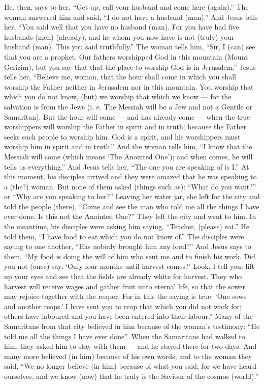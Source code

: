 \begin{pages}
\begin{Leftside}
		He, then, says to her, “Get up, call your husband and come here (again).” The woman answered him and said, “I do not have a husband (man).” And Jesus tells her, “You said well that you have no husband (man). For you have had five husbands (men) (already), and he whom you now have is not (truly) your husband (man). This you said truthfully.” The woman tells him, “Sir, I (can) see that you are a prophet. Our fathers worshipped God in this mountain (Mount Gerizim), but you say that that the place to worship God is in Jerusalem.” Jesus tells her, “Believe me, woman, that the hour shall come in which you shall worship the Father neither in Jerusalem nor in this mountain. You worship that which you do not know, (but) we worship that which we know — for the salvation is from the Jews (i. e. The Messiah will be a Jew and not a Gentile or Samaritan). But the hour will come — and has already come — when the true worshippers will worship the Father in spirit and in truth; because the Father seeks such people to worship him. God is a spirit, and his worshippers must worship him in spirit and in truth.” And the woman tells him, “I know that the Messiah will come (which means ‘The Anointed One’); and when comes, he will tells us everything.” And Jesus tells her, “The one you are speaking of is I.”
		\pend
		\pstart
		At this moment, his disciples arrived and they were amazed that he was speaking to a (the?) woman. But none of them asked (things such as): “What do you want?” or “Why are you speaking to her?” Leaving her water jar, she left for the city and told the people (there), “Come and see the man who told me all the things I have ever done. Is this not the Anointed One?” They left the city and went to him. In the meantime, his disciples were asking him saying, “Teacher, (please) eat.” He told them, “I have food to eat which you do not know of.” The disciples were saying to one another, “Has nobody brought him any food?” And Jesus says to them, “My food is doing the will of him who sent me and to finish his work. Did you not (once) say, ‘Only four months until harvest comes?’ Look, I tell you: lift up your eyes and see that the fields are already white for harvest. They who harvest will receive wages and gather fruit unto eternal life, so that the sower may rejoice together with the reaper. For in this the saying is true: ‘One sows and another reaps.’ I have sent you to reap that which you did not work for; others have laboured and you have been entered into their labour.”
		\pend
		\pstart
		Many of the Samaritans from that city believed in him because of the woman’s testimony: “He told me all the things I have ever done”. When the Samaritans had walked to him, they asked him to stay with them — and he stayed there for two days. And many more believed (in him) because of his own words; and to the woman they said, “We no longer believe (in him) because of what you said; for we have heard ourselves, and we know (now) that he truly is the Saviour of the cosmos (world).”

\end{Leftside}
\end{pages}

